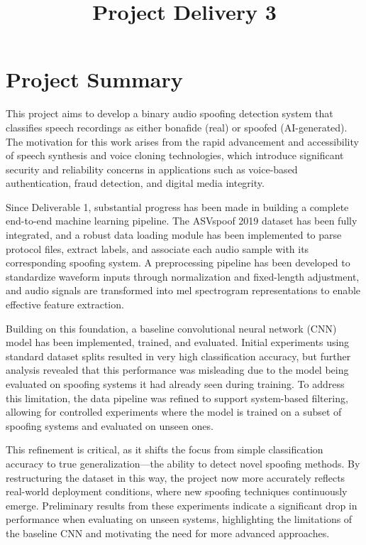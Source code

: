 \documentclass[conference]{IEEEtran}
\title{Project Delivery 3}
\author{
\IEEEauthorblockN{Joshua Thomas}
\IEEEauthorblockA{
MS in Artificial Intelligence Systems\\
University of Florida\\
Gainesville, USA\\
joshuathomas@ufl.edu}
}
\begin{document}
\maketitle

\section{Project Summary}

This project aims to develop a binary audio spoofing detection system that classifies speech recordings as either bonafide (real) or spoofed (AI-generated). The motivation for this work arises from the rapid advancement and accessibility of speech synthesis and voice cloning technologies, which introduce significant security and reliability concerns in applications such as voice-based authentication, fraud detection, and digital media integrity.

Since Deliverable 1, substantial progress has been made in building a complete end-to-end machine learning pipeline. The ASVspoof 2019 dataset has been fully integrated, and a robust data loading module has been implemented to parse protocol files, extract labels, and associate each audio sample with its corresponding spoofing system. A preprocessing pipeline has been developed to standardize waveform inputs through normalization and fixed-length adjustment, and audio signals are transformed into mel spectrogram representations to enable effective feature extraction.

Building on this foundation, a baseline convolutional neural network (CNN) model has been implemented, trained, and evaluated. Initial experiments using standard dataset splits resulted in very high classification accuracy, but further analysis revealed that this performance was misleading due to the model being evaluated on spoofing systems it had already seen during training. To address this limitation, the data pipeline was refined to support system-based filtering, allowing for controlled experiments where the model is trained on a subset of spoofing systems and evaluated on unseen ones.

This refinement is critical, as it shifts the focus from simple classification accuracy to true generalization—the ability to detect novel spoofing methods. By restructuring the dataset in this way, the project now more accurately reflects real-world deployment conditions, where new spoofing techniques continuously emerge. Preliminary results from these experiments indicate a significant drop in performance when evaluating on unseen systems, highlighting the limitations of the baseline CNN and motivating the need for more advanced approaches.
\end{document}
